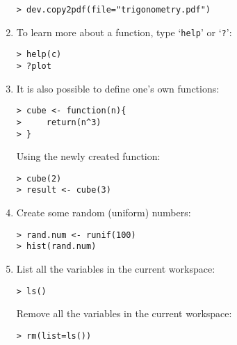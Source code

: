 \documentclass[11pt]{article}
\begin{document}
\begin{enumerate}
\begin{verbatim}
> dev.copy2pdf(file="trigonometry.pdf")
\end{verbatim}

\item To learn more about a function, type `\texttt{help}' or
  `\texttt{?}':

\begin{verbatim}
> help(c)
> ?plot
\end{verbatim}

\item It is also possible to define one's own functions:

\begin{verbatim}
> cube <- function(n){
>     return(n^3)
> }
\end{verbatim}

Using the newly created function:

\begin{verbatim}
> cube(2)
> result <- cube(3)
\end{verbatim}

\item Create some random (uniform) numbers:

\begin{verbatim}
> rand.num <- runif(100)
> hist(rand.num)
\end{verbatim}

\item List all the variables in the current workspace:

\begin{verbatim}
> ls()
\end{verbatim}

Remove all the variables in the current workspace:

\begin{verbatim}
> rm(list=ls())
\end{verbatim}


\end{enumerate}
\end{document}
